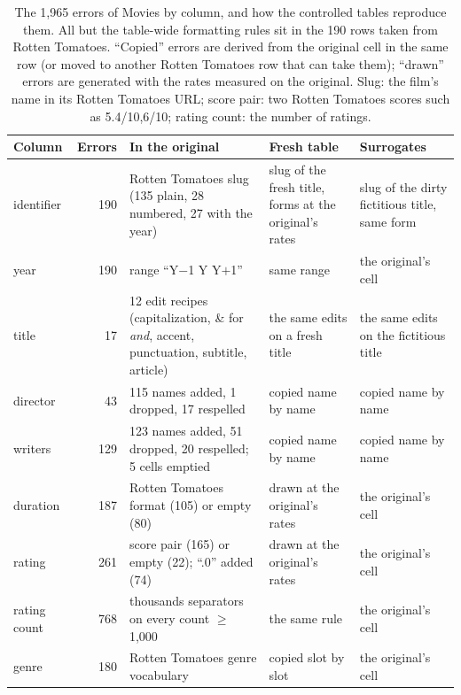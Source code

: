 \begin{table}[t]
  \caption{The 1,965 errors of Movies by column, and how the controlled tables reproduce them. All but the table-wide
  formatting rules sit in the 190 rows taken from Rotten Tomatoes. ``Copied'' errors are derived from the original
  cell in the same row (or moved to another Rotten Tomatoes row that can take them); ``drawn'' errors are generated
  with the rates measured on the original. Slug: the film's name in its Rotten Tomatoes URL; score pair: two Rotten
  Tomatoes scores such as 5.4/10,6/10; rating count: the number of ratings.}
  \label{tab:movieserrors}
  \small
  \begin{tabular}{@{}lr p{6.4cm} p{3.75cm} p{3.75cm}@{}}
    \toprule
    Column & Errors & In the original & Fresh table & Surrogates \\
    \midrule
    identifier & 190 & Rotten Tomatoes slug (135 plain, 28 numbered, 27 with the year) & slug of the fresh title, forms at the original's rates & slug of the dirty fictitious title, same form \\
    year & 190 & range ``Y$-$1 Y Y$+$1'' & same range & the original's cell \\
    title & 17 & 12 edit recipes (capitalization, \& for \emph{and}, accent, punctuation, subtitle, article) & the same edits on a fresh title & the same edits on the fictitious title \\
    director & 43 & 115 names added, 1 dropped, 17 respelled & copied name by name & copied name by name \\
    writers & 129 & 123 names added, 51 dropped, 20 respelled; 5 cells emptied & copied name by name & copied name by name \\
    duration & 187 & Rotten Tomatoes format (105) or empty (80) & drawn at the original's rates & the original's cell \\
    rating & 261 & score pair (165) or empty (22); ``.0'' added (74) & drawn at the original's rates & the original's cell \\
    rating count & 768 & thousands separators on every count $\geq$ 1,000 & the same rule & the original's cell \\
    genre & 180 & Rotten Tomatoes genre vocabulary & copied slot by slot & the original's cell \\
    \bottomrule
  \end{tabular}
\end{table}
